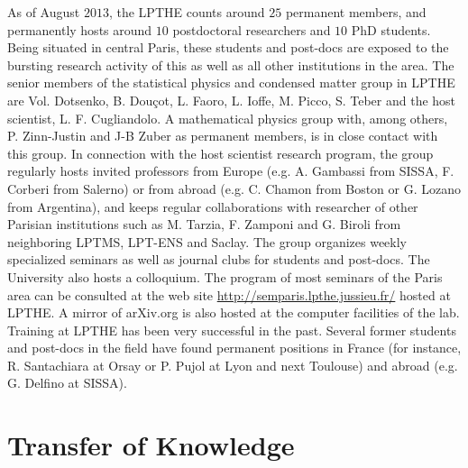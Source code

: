 \documentclass[a4paper,11pt,color]{article}
\begin{document}
 {
As of August $2013$, the LPTHE counts around $25$ permanent members, and  permanently hosts around $10$ postdoctoral researchers and $10$ PhD students. Being situated in central Paris, these students and post-docs are exposed to the bursting research activity of this as well as all other institutions in the area. The senior members of the statistical physics and condensed matter group in LPTHE are Vol. Dotsenko, B. Dou\c{c}ot, L. Faoro,  L. Ioffe, M. Picco, S. Teber  and the host scientist, L. F. Cugliandolo. A mathematical physics group with, among others, P. Zinn-Justin and J-B Zuber as permanent members, is in close contact with this group. In connection with the host scientist research program, the group regularly hosts invited professors from Europe (e.g. A. Gambassi from SISSA, F. Corberi from  Salerno) or from abroad (e.g. C. Chamon from Boston or G. Lozano from Argentina), and keeps regular collaborations with researcher of other Parisian institutions such as M. Tarzia, F. Zamponi and G. Biroli from 
neighboring LPTMS, LPT-ENS and Saclay. The group organizes weekly specialized seminars as well as journal clubs for students and post-docs. The University also hosts a colloquium. The program of most seminars of the Paris area can be consulted at the 
web site \url{http://semparis.lpthe.jussieu.fr/} hosted at LPTHE. A mirror of arXiv.org is also hosted at  the computer facilities of the 
lab. Training at LPTHE has been very successful in the past. Several former students and post-docs in the field have found permanent positions in France (for instance, R. Santachiara at Orsay or P. Pujol at Lyon and next Toulouse) and abroad (e.g. G. Delfino at SISSA).}

\newpage
\section{Transfer of Knowledge}
\label{sec:training}
\end{document}
